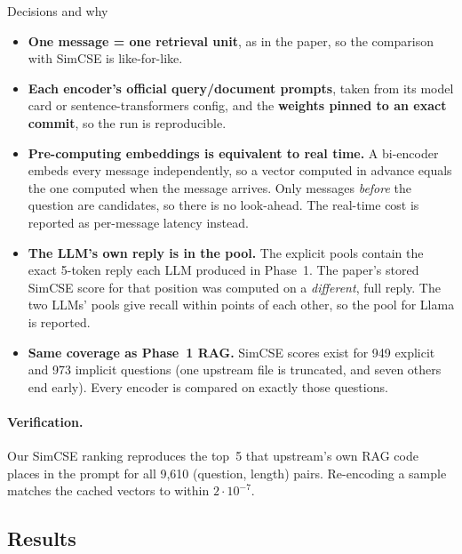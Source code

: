 \documentclass[11pt,a4paper]{article}
\begin{document}
\begin{decision}{Decisions and why}
\begin{itemize}[leftmargin=12pt]
  \item \textbf{One message = one retrieval unit}, as in the paper, so the comparison with SimCSE is like-for-like.
  \item \textbf{Each encoder's official query/document prompts}, taken from its model card or sentence-transformers config, and the
        \textbf{weights pinned to an exact commit}, so the run is reproducible.
  \item \textbf{Pre-computing embeddings is equivalent to real time.} A bi-encoder embeds every message independently, so a vector computed in
        advance equals the one computed when the message arrives. Only messages \emph{before} the question are candidates, so there is no look-ahead.
        The real-time cost is reported as per-message latency instead.
  \item \textbf{The LLM's own reply is in the pool.} The explicit pools contain the exact 5-token reply each LLM produced in Phase~1. The paper's
        stored SimCSE score for that position was computed on a \emph{different}, full reply. The two LLMs' pools give recall within
        \qReplyGap{} points of each other, so the pool for Llama is reported.
  \item \textbf{Same coverage as Phase~1 RAG.} SimCSE scores exist for 949 explicit and 973 implicit questions (one upstream file is truncated,
        and seven others end early). Every encoder is compared on exactly those questions.
\end{itemize}
\end{decision}

\paragraph{Verification.} Our SimCSE ranking reproduces the top~5 that upstream's own RAG code places in the prompt for all 9{,}610
(question, length) pairs. Re-encoding a sample matches the cached vectors to within $2\cdot10^{-7}$.

\subsection{Results}
\begin{table}[H]
\centering\small
\resizebox{\linewidth}{!}{}
\caption{Retrieval of the preference message (recall@5 unless noted; questions with stored SimCSE scores). Latency = median ms to embed one
message (batch~1, RTX~3060, fp32).}
\label{tab:retrieval}
\end{table}
\end{document}
